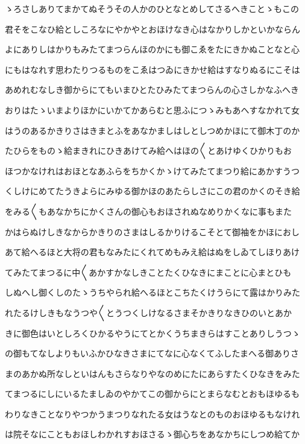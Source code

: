 \documentclass[a4paper,11pt,landscape]{ltjtarticle}
\begin{document}
ゝろさしありてまかてぬそうその人かのひとなとめしてさるへきことゝもこの
\par\medskip
君そをこなひ給としころなにやかやとおほけなき心はなかりしかといかならん
\par\medskip
よにありしはかりもみたてまつらんほのかにも御こゑをたにきかぬことなと心
\par\medskip
にもはなれす思わたりつるものをこゑはつゐにきかせ給はすなりぬるにこそは
\par\medskip
あめれむなしき御からにてもいまひとたひみたてまつらんの心さしかなふへき
\par\medskip
おりはたゝいまよりほかにいかてかあらむと思ふにつゝみもあへすなかれて女
\par\medskip
はうのあるかきりさはきまとふをあなかましはしとしつめかほにて御木丁のか
\par\medskip
たひらをものゝ給まきれにひきあけてみ給へはほの〱とあけゆくひかりもお
\par\medskip
ほつかなけれはおほとなあふらをちかくかゝけてみたてまつり給にあかすうつ
\par\medskip
くしけにめてたうきよらにみゆる御かほのあたらしさにこの君のかくのそき給
\par\medskip
をみる〱もあなかちにかくさんの御心もおほされぬなめりかくなに事もまた
\par\medskip
かはらぬけしきなからかきりのさまはしるかりけるこそとて御袖をかほにおし
\par\medskip
あて給へるほと大将の君もなみたにくれてめもみえ給はぬをしゐてしほりあけ
\par\medskip
てみたてまつるに中〱あかすかなしきことたくひなきにまことに心まとひも
\par\medskip
しぬへし御くしのたゝうちやられ給へるほとこちたくけうらにて露はかりみた
\par\medskip
れたるけしきもなうつや〱とうつくしけなるさまそかきりなきひのいとあか
\par\medskip
きに御色はいとしろくひかるやうにてとかくうちまきらはすことありしうつゝ
\par\medskip
の御もてなしよりもいふかひなきさまにてなに心なくてふしたまへる御ありさ
\par\medskip
まのあかぬ所なしといはんもさらなりやなのめにたにあらすたくひなきをみた
\par\medskip
てまつるにしにいるたましゐのやかてこの御からにとまらなむとおもほゆるも
\par\medskip
わりなきことなりやつかうまつりなれたる女はうなとのものおほゆるもなけれ
\par\medskip
は院そなにこともおほしわかれすおほさるゝ御心ちをあなかちにしつめ給てか
\end{document}
